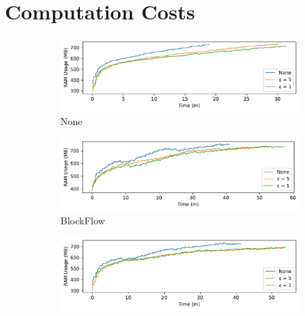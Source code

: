 
\section{Computation Costs}

\begin{figure}[!ht]
    \centering
    \begin{subfigure}[b]{0.49\textwidth}
        \centering
        \includegraphics[width=\textwidth]{graphics/05_priv_ram_none_client.pdf}
        \caption{None}
    \end{subfigure}
    \hfill
    \begin{subfigure}[b]{0.49\textwidth}
        \centering
        \includegraphics[width=\textwidth]{graphics/05_priv_ram_blockflow_client.pdf}
        \caption{BlockFlow}
    \end{subfigure}
    \hfill
    \begin{subfigure}[b]{0.49\textwidth}
        \centering
        \includegraphics[width=\textwidth]{graphics/05_priv_ram_marginalgain_client.pdf}

\end{subfigure}
\end{figure}
